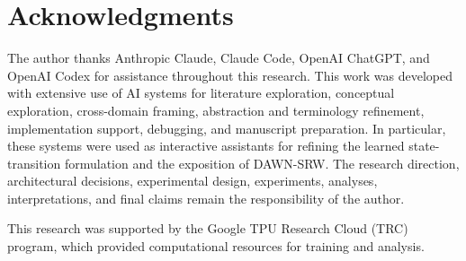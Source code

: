 \documentclass{article}
\newcommand{\DAWN}{DAWN-SRW}
\begin{document}
\section*{Acknowledgments}

The author thanks Anthropic Claude, Claude Code, OpenAI ChatGPT, and OpenAI
Codex for assistance throughout this research. This work was developed with
extensive use of AI systems for literature exploration, conceptual exploration,
cross-domain framing, abstraction and terminology refinement, implementation
support, debugging, and manuscript preparation. In particular, these systems
were used as interactive assistants for refining the learned state-transition
formulation and the exposition of \DAWN{}. The research direction,
architectural decisions, experimental design, experiments, analyses,
interpretations, and final claims remain the responsibility of the author.

This research was supported by the Google TPU Research Cloud (TRC) program,
which provided computational resources for training and analysis.

\begingroup
\footnotesize
\setlength{\bibsep}{0pt}


\endgroup
\end{document}

